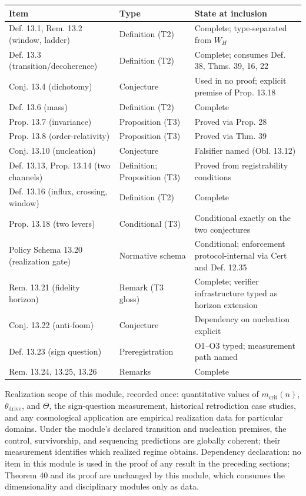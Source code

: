 \documentclass[11pt]{article}
\theoremstyle{definition}
\begin{document}
\begin{center}
\small
\begin{longtable}{@{}p{}p{}p{}@{}}
\toprule
Item & Type & State at inclusion\\
\midrule
\endhead
Def. 13.1, Rem. 13.2 (window, ladder) & Definition (T2) & Complete; type-separated from $W_H$\\
Def. 13.3 (transition/decoherence) & Definition (T2) & Complete; consumes Def. 38, Thms. 39, 16, 22\\
Conj. 13.4 (dichotomy) & Conjecture & Used in no proof; explicit premise of Prop. 13.18\\
Def. 13.6 (mass) & Definition (T2) & Complete\\
Prop. 13.7 (invariance) & Proposition (T3) & Proved via Prop. 28\\
Prop. 13.8 (order-relativity) & Proposition (T3) & Proved via Thm. 39\\
Conj. 13.10 (nucleation) & Conjecture & Falsifier named (Obl. 13.12)\\
Def. 13.13, Prop. 13.14 (two channels) & Definition; Proposition (T3) & Proved from registrability conditions\\
Def. 13.16 (influx, crossing, window) & Definition (T2) & Complete\\
Prop. 13.18 (two levers) & Conditional (T3) & Conditional exactly on the two conjectures\\
Policy Schema 13.20 (realization gate) & Normative schema & Conditional; enforcement protocol-internal via Cert and Def. 12.35\\
Rem. 13.21 (fidelity horizon) & Remark (T3 gloss) & Complete; verifier infrastructure typed as horizon extension\\
Conj. 13.22 (anti-foom) & Conjecture & Dependency on nucleation explicit\\
Def. 13.23 (sign question) & Preregistration & O1--O3 typed; measurement path named\\
Rem. 13.24, 13.25, 13.26 & Remarks & Complete\\
\bottomrule
\end{longtable}
\end{center}

Realization scope of this module, recorded once: quantitative values of $m_{\mathrm{crit}}(n)$, $\theta_{\mathrm{drive}}$, and $\Theta$, the sign-question measurement, historical retrodiction case studies, and any cosmological application are empirical realization data for particular domains. Under the module's declared transition and nucleation premises, the control, survivorship, and sequencing predictions are globally coherent; their measurement identifies which realized regime obtains. Dependency declaration: no item in this module is used in the proof of any result in the preceding sections; Theorem 40 and its proof are unchanged by this module, which consumes the dimensionality and disciplinary modules only as data.
\end{document}
